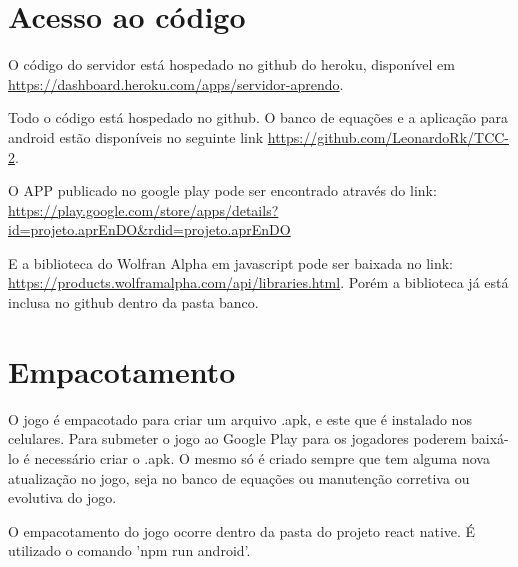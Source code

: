 \section[Acesso ao código]{Acesso ao código}
O código do servidor está hospedado no github do heroku, disponível em \url{https://dashboard.heroku.com/apps/servidor-aprendo}.

Todo o código está hospedado no github. O banco de equações e a aplicação para android estão disponíveis no seguinte link \url{https://github.com/LeonardoRk/TCC-2}.


O APP publicado no google play pode ser encontrado através do link: \url{https://play.google.com/store/apps/details?id=projeto.aprEnDO&rdid=projeto.aprEnDO}

E a biblioteca do Wolfran Alpha em javascript pode ser baixada no link: \url{https://products.wolframalpha.com/api/libraries.html}. Porém a biblioteca já está inclusa no github dentro da pasta banco.

\section[Empacotamento]{Empacotamento}
O jogo é empacotado para criar um arquivo .apk, e este que é instalado nos celulares. Para submeter o jogo ao Google Play para os jogadores poderem baixá-lo é necessário criar o .apk. O mesmo só é criado sempre que tem alguma nova atualização no jogo, seja no banco de equações ou manutenção corretiva ou evolutiva do jogo.

O empacotamento do jogo ocorre dentro da pasta do projeto react native. É utilizado o comando 'npm run android'.



